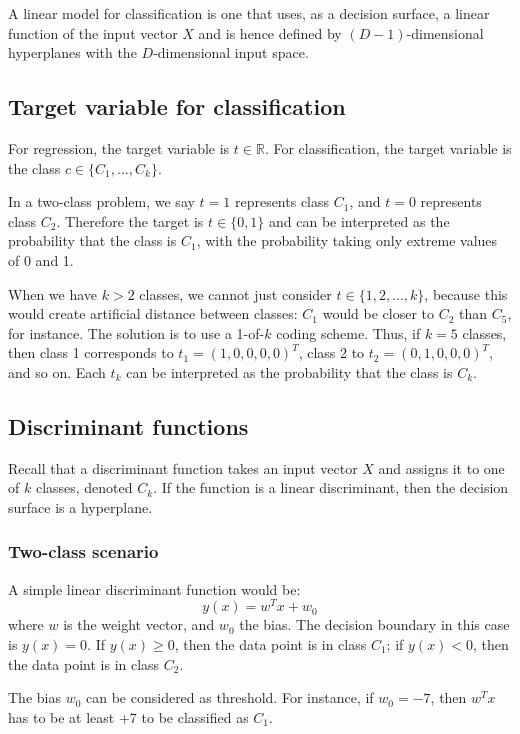 \documentclass[a4paper,12pt]{article}
\begin{document}
A linear model for classification is one that uses, as a decision surface, a linear function of the input vector $X$ and is hence defined by $(D-1)$-dimensional hyperplanes with the $D$-dimensional input space. 

\subsection{Target variable for classification}

For regression, the target variable is $t \in \mathbb{R}$. For classification, the target variable is the class $c \in \{C_1, ..., C_k\}$. 

In a two-class problem, we say $t=1$ represents class $C_1$, and $t=0$ represents class $C_2$. Therefore the target is $t \in \{0, 1\}$ and can be interpreted as the probability that the class is $C_1$, with the probability taking only extreme values of 0 and 1. 

When we have $k>2$ classes, we cannot just consider $t \in \{1, 2, ..., k\}$, because this would create artificial distance between classes: $C_1$ would be closer to $C_2$ than $C_5$, for instance. The solution is to use a 1-of-$k$ coding scheme. Thus, if $k=5$ classes, then class 1 corresponds to $t_1 = (1, 0, 0, 0, 0)^T$, class 2 to $t_2 = (0, 1, 0, 0, 0)^T$, and so on. Each $t_k$ can be interpreted as the probability that the class is $C_k$. 

\subsection{Discriminant functions}

Recall that a discriminant function takes an input vector $X$ and assigns it to one of $k$ classes, denoted $C_k$. If the function is a linear discriminant, then the decision surface is a hyperplane. 

\subsubsection{Two-class scenario}

A simple linear discriminant function would be: 
$$y(x) = w^Tx+w_0$$
where $w$ is the weight vector, and $w_0$ the bias. The decision boundary in this case is $y(x)=0$. If $y(x)\geq0$, then the data point is in class $C_1$; if $y(x)<0$, then the data point is in class $C_2$. 

The bias $w_0$ can be considered as threshold. For instance, if $w_0 = -7$, then $w^Tx$ has to be at least +7 to be classified as $C_1$. 
\end{document}
